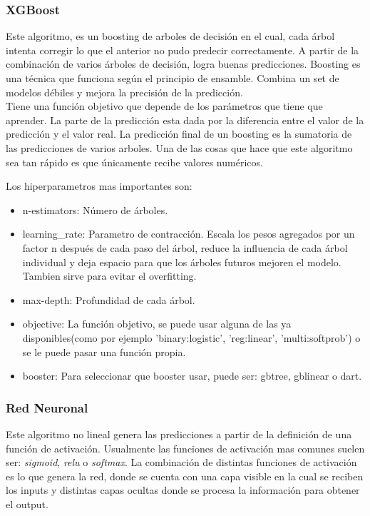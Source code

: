 \documentclass[12pt,a4paper]{article}
\begin{document}
\subsubsection{XGBoost}
Este algoritmo, es un boosting de arboles de decisión en el cual, cada árbol intenta corregir lo que el anterior no pudo predecir correctamente. A partir de la combinación de varios árboles de decisión, logra buenas predicciones. Boosting es una técnica que funciona según el principio de ensamble. Combina un set de modelos débiles y mejora la precisión de la predicción.\\
Tiene una función objetivo que depende de los parámetros que tiene que aprender. La parte de la predicción esta dada por la diferencia entre el valor de la predicción y el valor real. La predicción final de un boosting es la sumatoria de las predicciones de varios arboles. Una de las cosas que hace que este algoritmo sea tan rápido es que únicamente recibe valores numéricos.
 
Los hiperparametros mas importantes son:
 \begin{itemize}
    \item n-estimators: Número de árboles.
    
    \item learning\_rate: Parametro de contracción. Escala los pesos agregados por un factor n  después de cada paso del árbol, reduce la influencia de cada árbol individual y deja espacio para que los  árboles futuros mejoren el modelo. Tambien sirve para evitar el overfitting.
    
    \item max-depth: Profundidad de cada árbol.
    
    \item objective: La función objetivo, se puede usar alguna de las ya disponibles(como por ejemplo 'binary:logistic', 'reg:linear', 'multi:softprob') o se le puede pasar una función propia.
    
    \item booster: Para seleccionar que booster usar, puede ser: gbtree, gblinear o dart.
    
\end{itemize}

\subsubsection{Red Neuronal}
Este algoritmo no lineal genera las predicciones a partir de la definición de una función de activación. Usualmente las funciones de activación mas comunes suelen ser: \textit{sigmoid}, \textit{relu} o \textit{softmax}. La combinación de distintas funciones de activación es lo que genera la red, donde se cuenta con una capa visible en la cual se reciben los inputs y distintas capas ocultas donde se procesa la información para obtener el output.
\end{document}
